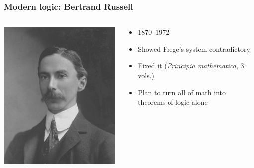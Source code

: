 \begin{frame}
  \frametitle{Modern logic: Bertrand Russell}

  \begin{columns}
    \begin{column}{.5\textwidth}
      \includegraphics[width=\textwidth]{../assets/russell}
    \end{column}
    \begin{column}{.5\textwidth}
      \begin{itemize}
        \item 1870--1972
        \item Showed Frege's system contradictory
        \item Fixed it (\textit{Principia mathematica}, 3 vols.)
        \item Plan to turn all of math into theorems of logic alone
      \end{itemize}
    \end{column}
  \end{columns}
\end{frame}

